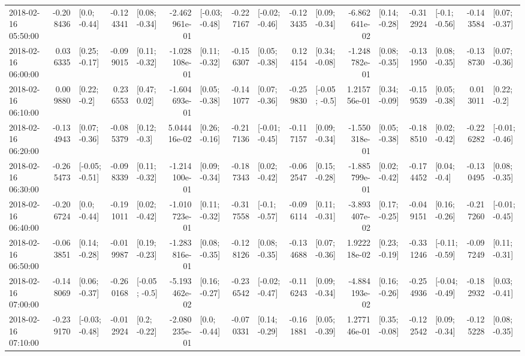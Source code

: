 \begin{tabular}{lrlrlrlrlrlrlrlrl}
2018-02-16 05:50:00 & -0.208436 &    [0.0; -0.44] & -0.124341 &   [0.08; -0.34] & -2.462961e-01 &  [-0.03; -0.48] & -0.227167 &  [-0.02; -0.46] & -0.123435 &   [0.09; -0.34] & -6.862641e-02 &   [0.14; -0.28] & -0.312924 &   [-0.1; -0.56] & -0.143584 &   [0.07; -0.37] \\
2018-02-16 06:00:00 &  0.036335 &   [0.25; -0.17] & -0.099015 &   [0.11; -0.32] & -1.028108e-01 &   [0.11; -0.32] & -0.156307 &   [0.05; -0.38] &  0.124154 &   [0.34; -0.08] & -1.248782e-01 &   [0.08; -0.35] & -0.131950 &   [0.08; -0.35] & -0.138730 &   [0.07; -0.36] \\
2018-02-16 06:10:00 &  0.009880 &    [0.22; -0.2] &  0.236553 &    [0.47; 0.02] & -1.604693e-01 &   [0.05; -0.38] & -0.141077 &   [0.07; -0.36] & -0.259830 &   [-0.05; -0.5] &  1.215756e-01 &   [0.34; -0.09] & -0.159539 &   [0.05; -0.38] &  0.013011 &    [0.22; -0.2] \\
2018-02-16 06:20:00 & -0.134943 &   [0.07; -0.36] & -0.085379 &    [0.12; -0.3] &  5.044416e-02 &   [0.26; -0.16] & -0.217136 &  [-0.01; -0.45] & -0.117157 &   [0.09; -0.34] & -1.550318e-01 &   [0.05; -0.38] & -0.188510 &   [0.02; -0.42] & -0.226282 &  [-0.01; -0.46] \\
2018-02-16 06:30:00 & -0.265473 &  [-0.05; -0.51] & -0.098339 &   [0.11; -0.32] & -1.214100e-01 &   [0.09; -0.34] & -0.187343 &   [0.02; -0.42] & -0.062547 &   [0.15; -0.28] & -1.885799e-01 &   [0.02; -0.42] & -0.174452 &    [0.04; -0.4] & -0.130495 &   [0.08; -0.35] \\
2018-02-16 06:40:00 & -0.206724 &    [0.0; -0.44] & -0.191011 &   [0.02; -0.42] & -1.010723e-01 &   [0.11; -0.32] & -0.317558 &   [-0.1; -0.57] & -0.096114 &   [0.11; -0.31] & -3.893407e-02 &   [0.17; -0.25] & -0.049151 &   [0.16; -0.26] & -0.217260 &  [-0.01; -0.45] \\
2018-02-16 06:50:00 & -0.063851 &   [0.14; -0.28] & -0.019987 &   [0.19; -0.23] & -1.283816e-01 &   [0.08; -0.35] & -0.128126 &   [0.08; -0.35] & -0.134688 &   [0.07; -0.36] &  1.922218e-02 &   [0.23; -0.19] & -0.331246 &  [-0.11; -0.59] & -0.097249 &   [0.11; -0.31] \\
2018-02-16 07:00:00 & -0.148069 &   [0.06; -0.37] & -0.260168 &   [-0.05; -0.5] & -5.193462e-02 &   [0.16; -0.27] & -0.236542 &  [-0.02; -0.47] & -0.116243 &   [0.09; -0.34] & -4.884193e-02 &   [0.16; -0.26] & -0.254936 &  [-0.04; -0.49] & -0.182932 &   [0.03; -0.41] \\
2018-02-16 07:10:00 & -0.239170 &  [-0.03; -0.48] & -0.012924 &    [0.2; -0.22] & -2.080235e-01 &    [0.0; -0.44] & -0.070331 &   [0.14; -0.29] & -0.161881 &   [0.05; -0.39] &  1.277146e-01 &   [0.35; -0.08] & -0.122542 &   [0.09; -0.34] & -0.125228 &   [0.08; -0.35] \\

\end{tabular}
